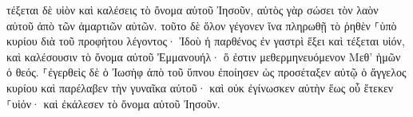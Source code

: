 \documentclass{openreader}
\begin{document}
τέξεται δὲ υἱὸν καὶ καλέσεις τὸ ὄνομα αὐτοῦ Ἰησοῦν, αὐτὸς γὰρ σώσει τὸν λαὸν αὐτοῦ ἀπὸ τῶν ἁμαρτιῶν αὐτῶν. 
τοῦτο δὲ ὅλον γέγονεν ἵνα πληρωθῇ τὸ ῥηθὲν ⸀ὑπὸ κυρίου διὰ τοῦ προφήτου λέγοντος· 
Ἰδοὺ ἡ παρθένος ἐν γαστρὶ ἕξει καὶ τέξεται υἱόν, καὶ καλέσουσιν τὸ ὄνομα αὐτοῦ Ἐμμανουήλ· ὅ ἐστιν μεθερμηνευόμενον Μεθ’ ἡμῶν ὁ θεός. 
⸀ἐγερθεὶς δὲ ὁ Ἰωσὴφ ἀπὸ τοῦ ὕπνου ἐποίησεν ὡς προσέταξεν αὐτῷ ὁ ἄγγελος κυρίου καὶ παρέλαβεν τὴν γυναῖκα αὐτοῦ· 
καὶ οὐκ ἐγίνωσκεν αὐτὴν ἕως οὗ ἔτεκεν ⸀υἱόν· καὶ ἐκάλεσεν τὸ ὄνομα αὐτοῦ Ἰησοῦν. 
\end{document}
